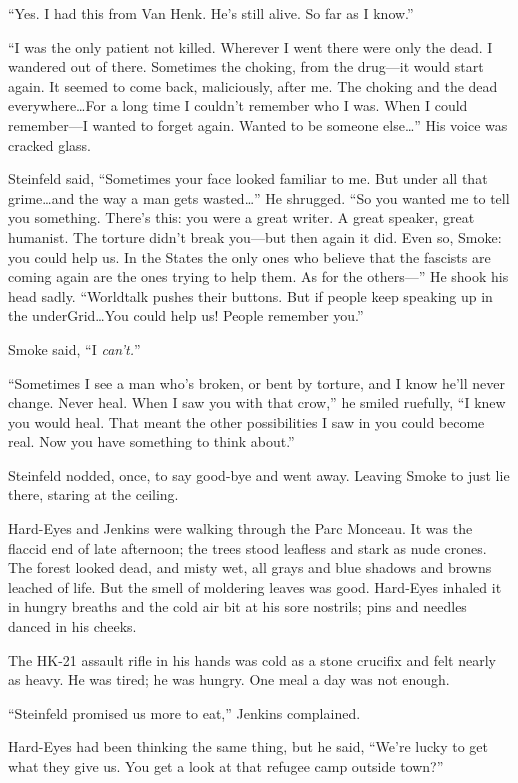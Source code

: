 ``Yes. I had this from Van Henk. He's still alive. So far as I know.''

``I was the only patient not killed. Wherever I went there were only the dead. I wandered out of there. Sometimes the choking, from the drug---it would start again. It seemed to come back, maliciously, after me. The choking and the dead everywhere\ldots For a long time I couldn't remember who I was. When I could remember---I wanted to forget again. Wanted to be someone else\ldots '' His voice was cracked glass.

Steinfeld said, ``Sometimes your face looked familiar to me. But under all that grime\ldots and the way a man gets wasted\ldots '' He shrugged. ``So you wanted me to tell you something. There's this: you were a great writer. A great speaker, great humanist. The torture didn't break you---but then again it did. Even so, Smoke: you could help us. In the States the only ones who believe that the fascists are coming again are the ones trying to help them. As for the others---'' He shook his head sadly. ``Worldtalk pushes their buttons. But if people keep speaking up in the underGrid\ldots You could help us! People remember you.''

Smoke said, ``I \textit{can't.}''

``Sometimes I see a man who's broken, or bent by torture, and I know he'll never change. Never heal. When I saw you with that crow,'' he smiled ruefully, ``I knew you would heal. That meant the other possibilities I saw in you could become real. Now you have something to think about.''

Steinfeld nodded, once, to say good-bye and went away. Leaving Smoke to just lie there, staring at the ceiling.

Hard-Eyes and Jenkins were walking through the Parc Monceau. It was the flaccid end of late afternoon; the trees stood leafless and stark as nude crones. The forest looked dead, and misty wet, all grays and blue shadows and browns leached of life. But the smell of moldering leaves was good. Hard-Eyes inhaled it in hungry breaths and the cold air bit at his sore nostrils; pins and needles danced in his cheeks.

The HK-21 assault rifle in his hands was cold as a stone crucifix and felt nearly as heavy. He was tired; he was hungry. One meal a day was not enough.

``Steinfeld promised us more to eat,'' Jenkins complained.

Hard-Eyes had been thinking the same thing, but he said, ``We're lucky to get what they give us. You get a look at that refugee camp outside town?''

